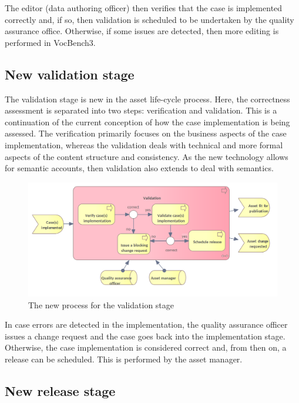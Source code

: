 	The editor (data authoring officer) then verifies that the case is implemented correctly and, if so, then validation is scheduled to be undertaken by the quality assurance office. Otherwise, if some issues are detected, then more editing is performed in VocBench3.
		
	
	\subsection{New validation stage}
	\label{sec:validation-new}	
	
	The validation stage is new in the asset life-cycle process. Here, the correctness assessment is separated into two steps: verification and validation. This is a continuation of the current conception of how the case implementation is being assessed. The verification primarily focuses on the business aspects of the case implementation, whereas the validation deals with  technical and more formal aspects of the content structure and consistency. As the new technology allows for semantic accounts, then validation also extends to deal with semantics. 	 

	\begin{figure}[h]
		\centering
		\includegraphics[width=.892\textwidth]{images/business/new/Validation.png}
		\caption{The new process for the validation stage}
		\label{fig:validation-new}
	\end{figure}

	In case errors are detected in the implementation, the quality assurance officer issues a  change request and the case goes back into the implementation stage. Otherwise, the case implementation is considered correct and, from then on, a release can be scheduled. This is performed by the asset manager. 
		
	\subsection{New release stage}
	\label{sec:release-new}
	
